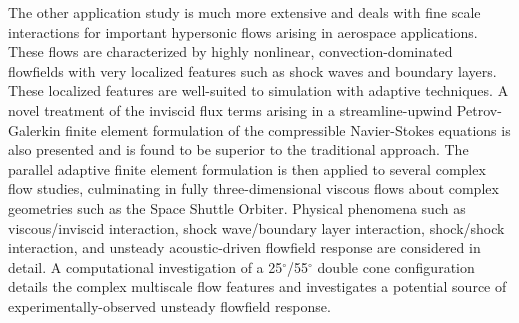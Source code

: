 The other application study is much more extensive and deals with fine scale interactions for important hypersonic flows arising in aerospace applications.  These flows are characterized by highly nonlinear, convection-dominated flowfields with very localized features such as shock waves and boundary layers. These localized features are well-suited to simulation with adaptive techniques. A novel treatment of the inviscid flux terms arising in a streamline-upwind Petrov-Galerkin finite element formulation of the compressible Navier-Stokes equations is also presented and is found to be superior to the traditional approach. The parallel adaptive finite element formulation is then applied to several complex flow studies, culminating in fully three-dimensional viscous flows about complex geometries such as the Space Shuttle Orbiter.  Physical phenomena such as viscous/inviscid interaction, shock wave/boundary layer interaction, shock/shock interaction, and unsteady acoustic-driven flowfield response are considered in detail.  A computational  investigation of a 25$^\circ$/55$^\circ$ double cone configuration details the complex multiscale flow features and investigates a potential source of experimentally-observed unsteady flowfield response.




